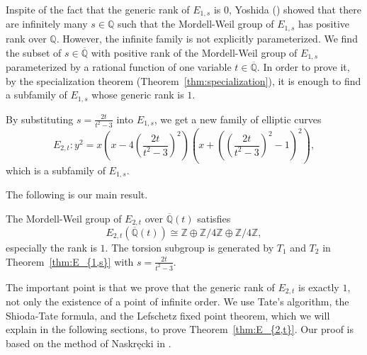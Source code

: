\documentclass[main]{subfiles}
\begin{document}
Inspite of the fact that the generic rank of $E_{1,s}$ is $0$, Yoshida (\cite[Corollary 4.7.]{ref:yoshida}) showed that there are infinitely many $s \in \mathbb{Q}$ such that the Mordell-Weil group of $E_{1,s}$ has positive rank over $\mathbb{Q}$.
However, the infinite family is not explicitly parameterized.
We find the subset of $s \in \overline{{\mathbb{Q}}}$ with positive rank of the Mordell-Weil group of $E_{1,s}$ parameterized by a rational function of one variable $t \in \overline{\mathbb{Q}}$.
In order to prove it, by the specialization theorem (Theorem~\ref{thm:specialization}), it is enough to find a subfamily of $E_{1,s}$ whose generic rank is $1$.

By substituting $s = \frac{2t}{t^{2} - 3}$ into $E_{1,s}$, we get a new family of elliptic curves
\begin{equation*}
    E_{2,t}: y^{2} = x \left(x - 4 \left(\frac{2t}{t^{2} - 3} \right)^{2} \right) \left(x + \left(\left(\frac{2t}{t^{2} - 3} \right)^{2} - 1 \right)^{2} \right),
\end{equation*}
which is a subfamily of $E_{1,s}$.

The following is our main result.
\begin{thm}
    \label{thm:E_{2,t}}
    The Mordell-Weil group of $E_{2,t}$ over $\overline{\mathbb{Q}}(t)$ satisfies
    \begin{equation*}
        E_{2,t}(\overline{\mathbb{Q}}(t)) \cong \mathbb{Z} \oplus \mathbb{Z} / 4 \mathbb{Z} \oplus \mathbb{Z} / 4 \mathbb{Z},
    \end{equation*}
    especially the rank is $1$.
    The torsion subgroup is generated by $T_1$ and $T_2$ in Theorem~\ref{thm:E_{1,s}} with $s = \frac{2t}{t^{2} - 3}$.
\end{thm}
The important point is that we prove that the generic rank of $E_{2,t}$ is exactly $1$, not only the existence of a point of infinite order.
We use Tate's algorithm, the Shioda-Tate formula, and the Lefschetz fixed point theorem, which we will explain in the following sections, to prove Theorem~\ref{thm:E_{2,t}}.
Our proof is based on the method of Naskręcki in \cite{ref:naskrecki2013}.
\end{document}
